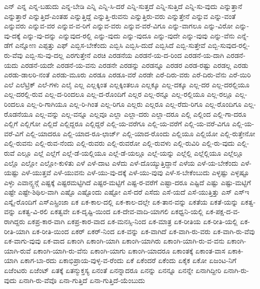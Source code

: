 {ಎನ್
ಎನ್ನ
ಎನ್ನ-ಬಹುದು
ಎನ್ನ-ಬೇಡಿ
ಎನ್ನಿ
ಎನ್ನಿ-ಸಿ-ದರೆ
ಎನ್ನಿ-ಸುತ್ತದೆ
ಎನ್ನಿ-ಸುತ್ತಿದೆ
ಎನ್ನಿ-ಸು-ವುದು
ಎನ್ನುತ್ತಾನೆ
ಎನ್ನುತ್ತಾರೆ
ಎನ್ನುತ್ತಿದೆ-ಎಂತಹ
ಎನ್ನುತ್ತಿದ್ದೆ
ಎನ್ನುತ್ತಿ-ರುವನು
ಎನ್ನುತ್ತಿರು-ವರು
ಎನ್ನುತ್ತೇನೆ
ಎನ್ನುವ
ಎನ್ನು-ವಂತೆ
ಎನ್ನುವರು
ಎನ್ನುವ-ವರ
ಎನ್ನುವ-ವ-ರಿಗೆ
ಎನ್ನುವ-ವರು
ಎನ್ನುವ-ವರೆ-ವಿಗೂ
ಎನ್ನು-ವಾಗಲೂ
ಎನ್ನು-ವಿರೋ
ಎನ್ನು-ವು-ದಕ್ಕೆ
ಎನ್ನು-ವು-ದನ್ನು
ಎನ್ನುವುದ-ರಲ್ಲಿ
ಎನ್ನು-ವುದು
ಎನ್ನು-ವುದೂ
ಎನ್ನು-ವುದೇ
ಎನ್ನು-ವುವು
ಎನ್ನು-ವೆನು
ಎನ್ನೆ-ಡೆಗೆ
ಎನ್ನೋಣ
ಎಪ್ಪತ್ತು
ಎಫ್
ಎಬ್ಬಿಸ-ಬೇಕೆಂದು
ಎಬ್ಬಿಸಿ
ಎಬ್ಬಿಸಿ-ದುದೆ
ಎಬ್ಬಿಸಿದೆ
ಎಬ್ಬಿ-ಸುತ್ತೇವೆ
ಎಬ್ಬಿ-ಸುವುದ-ರಲ್ಲಿ-ರು-ವೆವು
ಎಬ್ಬಿ-ಸು-ವು-ದಲ್ಲ
ಎರಗುತ್ತೇನೆ
ಎರಚಿ
ಎರಡನೆಯ
ಎರಡನೆ-ಯ-ದ-ರಿಂದ
ಎರಡನೆ-ಯ-ದಾಗಿ
ಎರಡನೆ-ಯದು
ಎರಡನೆ-ಯದೇ
ಎರಡನೆ-ಯ-ವನು
ಎರಡನೇ
ಎರಡನ್ನು
ಎರಡನ್ನೂ
ಎರಡರ
ಎರಡ-ರಷ್ಟು
ಎರಡಲ್ಲ
ಎರಡು
ಎರಡು-ಡಾಲರಿ-ನಂತೆ
ಎರಡು-ಮೂರು
ಎರಡೂ
ಎರಡೂ-ವರೆ
ಎರಡೇ
ಎರೆ-ದಿರು-ವರು
ಎರೆ-ದಿರು-ವೆನು
ಎರೆ-ಯಿರಿ
ಎಲೆ
ಎಲೆಟ್ರಿಕ್
ಎಲೆ-ಗಳು
ಎಲೈ
ಎಲ್ಲ
ಎಲ್ಲಕ್ಕಿಂತ
ಎಲ್ಲಕ್ಕಿಂತಲೂ
ಎಲ್ಲಕ್ಕೂ
ಎಲ್ಲ-ದಕ್ಕೂ
ಎಲ್ಲ-ದರ
ಎಲ್ಲ-ದರಲ್ಲಿಯೂ
ಎಲ್ಲ-ದರಲ್ಲಿ-ರುವ
ಎಲ್ಲ-ದ-ರಿಂದಲೂ
ಎಲ್ಲ-ದ-ರೊಂದಿಗೆ
ಎಲ್ಲರ
ಎಲ್ಲ-ರನ್ನೂ
ಎಲ್ಲ-ರಲ್ಲಿಯೂ
ಎಲ್ಲ-ರಲ್ಲೂ
ಎಲ್ಲ-ರಿಂದಲೂ
ಎಲ್ಲ-ರಿ-ಗಾಗಿಯೂ
ಎಲ್ಲ-ರಿ-ಗಿಂತ
ಎಲ್ಲ-ರಿಗೂ
ಎಲ್ಲರು
ಎಲ್ಲರೂ
ಎಲ್ಲ-ರೆದು-ರಿಗೂ
ಎಲ್ಲ-ರೊಂದಿಗೂ
ಎಲ್ಲ-ರೊಡನೆಯೂ
ಎಲ್ಲ-ವನ್ನು
ಎಲ್ಲ-ವನ್ನೂ
ಎಲ್ಲವೂ
ಎಲ್ಲಾ
ಎಲ್ಲಾ-ದರು
ಎಲ್ಲಾ-ದರೂ
ಎಲ್ಲಿ
ಎಲ್ಲಿಂದ
ಎಲ್ಲಿ-ಗಾ-ದರೂ
ಎಲ್ಲಿಗೆ
ಎಲ್ಲಿಗೋ
ಎಲ್ಲಿದೆ
ಎಲ್ಲಿದ್ದರೂ
ಎಲ್ಲಿದ್ದರೆ
ಎಲ್ಲಿ-ಯ-ವರೆಗೂ
ಎಲ್ಲಿ-ಯ-ವರೆಗೆ
ಎಲ್ಲಿ-ಯ-ವರೆ-ವಿಗೂ
ಎಲ್ಲಿ-ಯ-ವರೆ-ವಿಗೆ
ಎಲ್ಲಿ-ಯಾದರೂ
ಎಲ್ಲಿ-ಯಾದ-ರೂ-ಛಾರ್ಜ್
ಎಲ್ಲಿ-ಯಾದ-ರೊಂದು
ಎಲ್ಲಿಯೂ
ಎಲ್ಲಿಯೋ
ಎಲ್ಲಿ-ರುತ್ತೇನೋ
ಎಲ್ಲಿ-ರುವನು
ಎಲ್ಲಿ-ರುವ-ನೆಂದು
ಎಲ್ಲಿ-ರುವರು
ಎಲ್ಲಿ-ರುವರೋ
ಎಲ್ಲಿ-ರುವಳು
ಎಲ್ಲಿ-ರುವಿರಿ
ಎಲ್ಲಿ-ರು-ವುದು
ಎಲ್ಲಿ-ರುವೆ
ಎಲ್ಲೂ
ಎಲ್ಲೆ
ಎಲ್ಲೆಗೆ
ಎಲ್ಲೆ-ಡೆ-ಯಲ್ಲಿಯೂ
ಎಲ್ಲೆ-ಡೆ-ಯಲ್ಲೂ
ಎಲ್ಲೆ-ಯನ್ನು
ಎಲ್ಲೆಲ್ಲಿ
ಎಲ್ಲೆಲ್ಲಿಯೂ
ಎಲ್ಲೆಲ್ಲೂ
ಎಲ್ಲೊ
ಎಲ್ಲೋ
ಎಲ್ಲೋ-ಕುಳಿತು
ಎಳೆ
ಎಳೆ-ದಾಟ
ಎಳೆದು
ಎಳೆ-ದೊಯ್ಯುತ್ತಿದ್ದಾನೆ
ಎಳೆಯ
ಎಳೆ-ಯ-ಬೇಕೆಂದು
ಎಳೆ-ಯಷ್ಟು
ಎಳೆ-ಯುತ್ತವೆ
ಎಳೆ-ಯುವನು
ಎಳೆ-ಯು-ವು-ದಕ್ಕೆ
ಎಳೆ-ಯು-ವುವು
ಎಳೆ-ಸ-ಬೇಕೆಂಬುದು
ಎಳ್ಳಷ್ಟು
ಎಳ್ಳಷ್ಟೂ
ಎಳ್ಳು
ಎವಾನ್ಸ್ಟನ್ಗೆ
ಎಷ್ಟಕ್ಕೆ
ಎಷ್ಟರಮಟ್ಟಿಗಿದೆ
ಎಷ್ಟರ-ಮಟ್ಟಿಗೆ
ಎಷ್ಟ-ರ-ವರೆಗೆ
ಎಷ್ಟಾ-ದರೂ
ಎಷ್ಟಿದೆ
ಎಷ್ಟು
ಎಷ್ಟು-ಮಟ್ಟಿಗೆ
ಎಷ್ಟೇ
ಎಷ್ಟೇ-ಶಿಥಿಲ-ವಾಗಿ
ಎಷ್ಟೊ
ಎಷ್ಟೊಂದು
ಎಷ್ಟೋ
ಎಸೆ-ದರೆ
ಎಸೆದು
ಎಸೆ-ಯದೆ
ಎಸೆ-ಯುತ್ತಿತ್ತು
ಎಸ್
ಎಸ್ಇ
ಎಸ್ಕೈ-ರೊಂದಿಗೆ
ಎಸ್ಎಸ್ಪ್ರಿಂಜಾ
ಏಕ
ಏಕ-ಕಾಲ-ದಲ್ಲಿ
ಏಕ-ಕಾಲ-ದಲ್ಲೇ
ಏಕ-ತಾನ-ವನ್ನು
ಏಕತೆಯ
ಏಕತೆ-ಯನ್ನು
ಏಕತ್ವ-ವನ್ನು
ಏಕತ್ವ-ವಿ-ರಲಿ
ಏಕತ್ವವೇ
ಏಕ-ದೃಷ್ಟಿ-ಯಿಂದ
ಏಕ-ದೇವ-ವಾದಿ-ಯಾಗಲಿ
ಏಕಧ್ವನಿ-ಯಲ್ಲಿ
ಏಕ-ಪಕ್ಷ-ದ-ವ-ರಾಗಿದ್ದರು
ಏಕಪ್ರ-ಕಾರ-ವಾಗಿ
ಏಕಪ್ರ-ಕಾರ-ವಾದ
ಏಕ-ಮನಸ್ಸಿ-ನಿಂದ
ಏಕ-ಮಾತ್ರ
ಏಕ-ರೀತಿಯ
ಏಕ-ರೀತಿ-ಯಲ್ಲಿ
ಏಕ-ರೀತಿ-ಯಾಗಿ
ಏಕ-ರೀತಿ-ಯಿಂದ
ಏಕರ್
ಏಕರ್-ನಿಂದ
ಏಕ-ವನ್ನು
ಏಕ-ವಾಗಿದೆ
ಏಕ-ವಾಗಿ-ರು-ವರು
ಏಕ-ವಾಗಿ-ರು-ವೆವು
ಏಕ-ವಾಗು-ವುವು
ಏಕ-ವಾದ
ಏಕಾಂಗಿ
ಏಕಾಂಗಿ-ಯಾಗಿ
ಏಕಾಂಗಿ-ಯಾಗಿರು
ಏಕಾಂಗಿ-ಯಾಗಿ-ರು-ವ-ವನು
ಏಕಾಂಗಿ-ಯಾಗಿ-ರುವೆ
ಏಕಾಂಗಿ-ಯಾಗಿ-ರು-ವೆನು
ಏಕಾಂಗಿ-ಯಾಗು
ಏಕಾಂಗಿ-ಯಾದರೂ
ಏಕಾಂತಕ್ಕೆ
ಏಕಾಂತ-ವಾಸ
ಏಕಾಕಿ-ಯಾಗಿ
ಏಕಾಗ-ಬಾ-ರದು
ಏಕಾಭಿಪ್ರಾಯ-ವುಳ್ಳ-ವ-ರೆಂದು
ಏಕೆ
ಏಕೆಂದರೆ
ಏಕೆಂದು
ಏಕೈಕ
ಏಕೋ
ಏಜಂಟ-ನಿಗೆ
ಏಜೆಂಟರು
ಏಜೆಂಟ್
ಏತಕ್ಕೆ
ಏತನ್ಮುಕ್ತಸ್ಯ
ಏನಂತೆ
ಏನನ್ನಾದರೂ
ಏನನ್ನು
ಏನನ್ನೂ
ಏನನ್ನೇ
ಏನಾಗಿದ್ದೀರಿ
ಏನಾಗಿ-ರು-ವುದು
ಏನಾಗಿ-ರು-ವೆವೊ
ಏನಾ-ಗುತ್ತಿದೆ
ಏನಾ-ಗುತ್ತಿದೆ-ಯೆಂಬುದು
}
